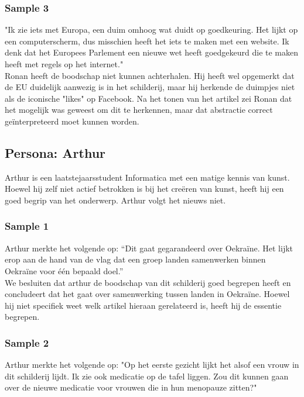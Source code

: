 \subsubsection{Sample 3}
"Ik zie iets met Europa, een duim omhoog wat duidt op goedkeuring. Het lijkt op een computerscherm, dus misschien heeft het iets te maken met een website. Ik denk dat het Europees Parlement een nieuwe wet heeft goedgekeurd die te maken heeft met regels op het internet." \\

Ronan heeft de boodschap niet kunnen achterhalen. Hij heeft wel opgemerkt dat de EU duidelijk aanwezig is in het schilderij, maar hij herkende de duimpjes niet als de iconische "likes" op Facebook. Na het tonen van het artikel zei Ronan dat het mogelijk was geweest om dit te herkennen, maar dat abstractie correct geïnterpreteerd moet kunnen worden.
 
 
 \subsection{Persona: Arthur}
Arthur is een laatstejaarsstudent Informatica met een matige kennis van kunst. Hoewel hij zelf niet actief betrokken is bij het creëren van kunst, heeft hij een goed begrip van het onderwerp. Arthur volgt het nieuws niet. 
 
 \subsubsection{Sample 1}
Arthur merkte het volgende op: ``Dit gaat gegarandeerd over Oekraïne. Het lijkt erop aan de hand van de vlag dat een groep landen samenwerken binnen Oekraïne voor één bepaald doel.'' \\
 
 We besluiten dat arthur de boodschap van dit schilderij goed begrepen heeft en concludeert dat het gaat over samenwerking tussen landen in Oekraïne. Hoewel hij niet specifiek weet welk artikel hieraan gerelateerd is, heeft hij de essentie begrepen. 
 
 \subsubsection{Sample 2}
 Arthur merkte het volgende op: "Op het eerste gezicht lijkt het alsof een vrouw in dit schilderij lijdt. Ik zie ook medicatie op de tafel liggen. Zou dit kunnen gaan over de nieuwe medicatie voor vrouwen die in hun menopauze zitten?" \\
 
